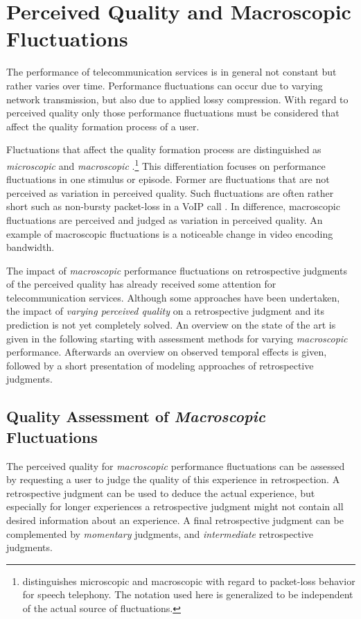 \section{Perceived Quality and Macroscopic Fluctuations}\label{chap:04}
The performance of telecommunication services is in general not constant but rather varies over time.
Performance fluctuations can occur due to varying network transmission, but also due to applied lossy compression.
With regard to perceived quality only those performance fluctuations must be considered that affect the quality formation process of a user.

Fluctuations that affect the quality formation process are distinguished as \emph{microscopic} and \emph{macroscopic} \citep[][p.\,72]{raake_short-_2006}.\footnote{\citet{raake_short-_2006} distinguishes microscopic and macroscopic with regard to packet-loss behavior for speech telephony. The notation used here is generalized to be independent of the actual source of fluctuations.}
This differentiation focuses on performance fluctuations in one stimulus or episode.
Former are fluctuations that are not perceived as variation in perceived quality.
Such fluctuations are often rather short such as non-bursty packet-loss in a \ac{VoIP} call \citep[\cf,][p.\,72]{raake_short-_2006}.
In difference, macroscopic fluctuations are perceived and judged as variation in perceived quality.
An example of macroscopic fluctuations is a noticeable change in video encoding bandwidth.

The impact of \emph{macroscopic} performance fluctuations on retrospective judgments of the perceived quality has already received some attention for telecommunication services.
Although some approaches have been undertaken, the impact of \emph{varying perceived quality} on a retrospective judgment and its prediction is not yet completely solved.
An overview on the state of the art is given in the following starting with assessment methods for varying \emph{macroscopic} performance.
Afterwards an overview on observed temporal effects is given, followed by a short presentation of modeling approaches of retrospective judgments.

\subsection{Quality Assessment of \emph{Macroscopic} Fluctuations}
The perceived quality for \emph{macroscopic} performance fluctuations can be assessed by requesting a user to judge the quality of this experience in retrospection.
A retrospective judgment can be used to deduce the actual experience, but especially for longer experiences a retrospective judgment might not contain all desired information about an experience.
A final retrospective judgment can be complemented by \emph{momentary} judgments, and \emph{intermediate} retrospective judgments.

